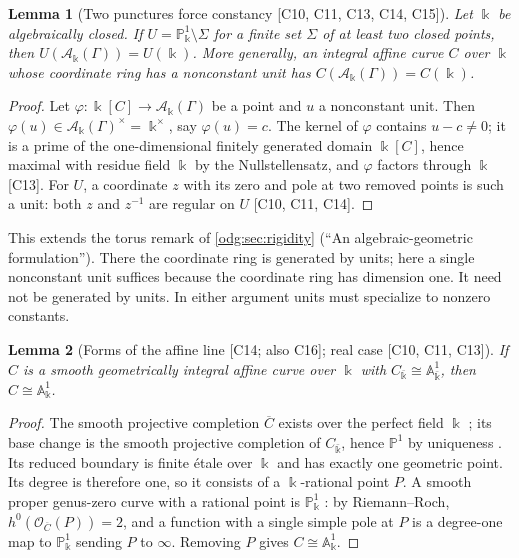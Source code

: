 \documentclass[11pt,oneside]{article}
\numberwithin{equation}{section}
\newtheorem{lemma}[lemma]{Lemma}
\theoremstyle{definition}
\theoremstyle{remark}
\newcommand{\src}[1]{\textup{\textsf{\small[#1]}}}
\newcommand{\crA}{\mathcal A_\Bbbk(\Gamma)}
\newcommand{\Aff}{\mathbb A}
\begin{document}
\begin{lemma}[Two punctures force constancy \src{C10, C11, C13, C14, C15}]\label{odg:cr:lem:punctures}
Let $\Bbbk$ be algebraically closed. If $U=\mathbb P^1_\Bbbk\setminus\Sigma$ for a
finite set $\Sigma$ of at least two closed points, then $U(\crA)=U(\Bbbk)$.
More generally, an integral affine curve
$C$ over $\Bbbk$ whose coordinate ring has a nonconstant unit has
$C(\crA)=C(\Bbbk)$.
\end{lemma}
\begin{proof}
Let $\varphi:\Bbbk[C]\to\crA$ be a point and $u$ a nonconstant unit. Then
$\varphi(u)\in\crA^\times=\Bbbk^\times$, say $\varphi(u)=c$. The kernel of $\varphi$
contains $u-c\ne0$; it is a prime of the one-dimensional finitely generated domain
$\Bbbk[C]$, hence maximal with residue field $\Bbbk$ by the Nullstellensatz, and
$\varphi$ factors through $\Bbbk$ \src{C13}. For $U$, a coordinate $z$ with its zero
and pole at two removed points is such a unit: both $z$ and $z^{-1}$ are regular
on $U$ \src{C10, C11, C14}.
\end{proof}

This extends the torus remark of \cref{odg:sec:rigidity}
(``An algebraic-geometric formulation''). There the coordinate ring is
generated by units; here a single nonconstant unit suffices because the
coordinate ring has dimension one. It need not be generated by units.
In either argument units must specialize to nonzero constants.

\begin{lemma}[Forms of the affine line \src{C14; also C16}; real case \src{C10, C11, C13}]\label{odg:cr:lem:formA1}
If $C$ is a smooth geometrically integral affine curve over $\Bbbk$ with
$C_{\bar\Bbbk}\cong\Aff^1_{\bar\Bbbk}$, then $C\cong\Aff^1_\Bbbk$.
\end{lemma}
\begin{proof}
The smooth projective completion $\overline C$ exists over the perfect field
$\Bbbk$ \cite{StacksCurveCompletion}; its base change is the smooth projective
completion of $C_{\bar\Bbbk}$, hence $\mathbb P^1$ by uniqueness
\cite{StacksCurves}. Its reduced boundary is finite \'etale over $\Bbbk$ and has
exactly one geometric point. Its degree is therefore one, so it consists of a
$\Bbbk$-rational point $P$. A smooth proper genus-zero curve with a
rational point is $\mathbb P^1_\Bbbk$ \cite{StacksGenusZero}: by Riemann--Roch,
$h^0(\mathcal O_{\overline C}(P))=2$, and a function with a single simple pole at
$P$ is a degree-one map to $\mathbb P^1_\Bbbk$ sending $P$ to $\infty$. Removing
$P$ gives $C\cong\Aff^1_\Bbbk$.
\end{proof}
\end{document}
